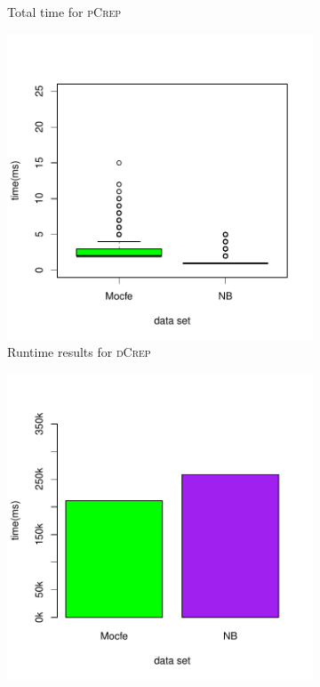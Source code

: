 \documentclass[a4paper,UKenglish,cleveref, autoref, thm-restate,authorcolumns]{lipics-v2019}
\newcommand{\adjDel}{\textsc{pCrep}}
\newcommand{\directDecomp}{\textsc{dCrep}}
\begin{document}
\begin{figure}
\begin{minipage}{0.48\linewidth}
\begin{subfigure}[b]{\linewidth}
			\caption{Total time for \adjDel}
		\end{subfigure}		
	\end{minipage}
	\begin{minipage}{0.48\linewidth}
		\begin{subfigure}[b]{\linewidth}
			\includegraphics*[width=\linewidth]{plots/new_time_hpc_filtered_compDecomp}
			\caption{Runtime results for \directDecomp}			
		\end{subfigure}		
	\end{minipage}
	\begin{minipage}{0.48\linewidth}
		\begin{subfigure}[b]{\linewidth}
			\includegraphics*[width=\linewidth]{plots/new_barplot_time_hpc_filtered_compDecomp}

\end{subfigure}
\end{minipage}
\end{figure}
\end{document}
